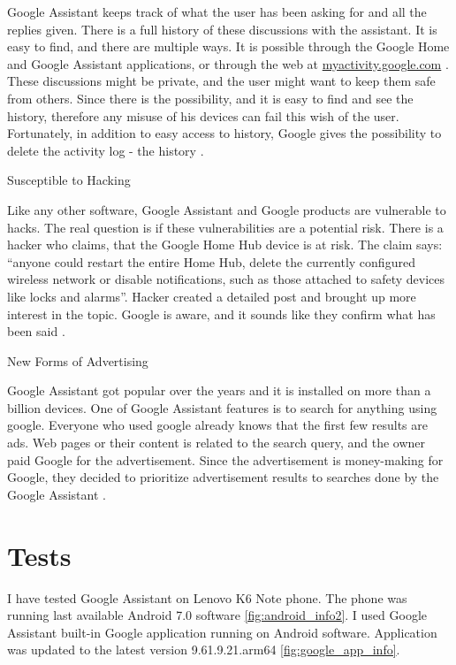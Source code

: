 \documentclass[
  digital, %
  oneside, %
  table,   %
  lof,     %
  lot,     %
]{fithesis3}
\begin{document}
\begin{compactitem}
Google Assistant keeps track of what the user has been asking for and all the replies given. There is a full history of these discussions with the assistant. It is easy to find, and there are multiple ways. It is possible through the Google Home and Google Assistant applications, or through the web at \href{https://myactivity.google.com/myactivity}{myactivity.google.com} \parencite{google_history}. These discussions might be private, and the user might want to keep them safe from others. Since there is the possibility, and it is easy to find and see the history, therefore any misuse of his devices can fail this wish of the user. Fortunately, in addition to easy access to history, Google gives the possibility to delete the activity log - the history \parencite{google_history2}.

  \item Susceptible to Hacking
  
Like any other software, Google Assistant and Google products are vulnerable to hacks. The real question is if these vulnerabilities are a potential risk. There is a hacker who claims, that the Google Home Hub device is at risk. The claim says: ``anyone could restart the entire Home Hub, delete the currently configured wireless network or disable notifications, such as those attached to safety devices like locks and alarms''. Hacker created a detailed post and brought up more interest in the topic. Google is aware, and it sounds like they confirm what has been said \parencite{google_hacks}.

  \item New Forms of Advertising
  
Google Assistant got popular over the years and it is installed on more than a billion devices. One of Google Assistant features is to search for anything using google. Everyone who used google already knows that the first few results are ads. Web pages or their content is related to the search query, and the owner paid Google for the advertisement. Since the advertisement is money-making for Google, they decided to prioritize advertisement results to searches done by the Google Assistant \parencite{google_ads}.

\end{compactitem}

\section{Tests}

I have tested Google Assistant on Lenovo K6 Note phone. The phone was running last available Android 7.0 software \ref{fig:android_info2}. I used Google Assistant built-in Google application running on Android software. Application was updated to the latest version 9.61.9.21.arm64 \ref{fig:google_app_info}.
\end{document}
